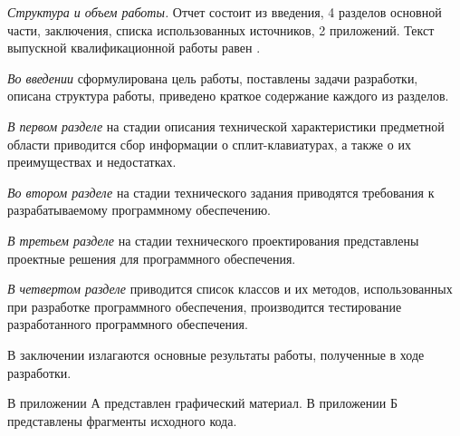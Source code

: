 \emph{Структура и объем работы.} Отчет состоит из введения, 4 разделов основной части, заключения, списка использованных источников, 2 приложений. Текст выпускной квалификационной работы равен .

\emph{Во введении} сформулирована цель работы, поставлены задачи разработки, описана структура работы, приведено краткое содержание каждого из разделов.

\emph{В первом разделе} на стадии описания технической характеристики предметной области приводится сбор информации о сплит-клавиатурах, а также о их преимуществах и недостатках.

\emph{Во втором разделе} на стадии технического задания приводятся требования к разрабатываемому программному обеспечению.

\emph{В третьем разделе} на стадии технического проектирования представлены проектные решения для программного обеспечения.

\emph{В четвертом разделе} приводится список классов и их методов, использованных при разработке программного обеспечения, производится тестирование разработанного программного обеспечения.

В заключении излагаются основные результаты работы, полученные в ходе разработки.

В приложении А представлен графический материал.
В приложении Б представлены фрагменты исходного кода. 
